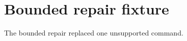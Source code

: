 \documentclass{article}
\begin{document}
\section*{Bounded repair fixture}
The bounded repair replaced one unsupported command.
\end{document}

